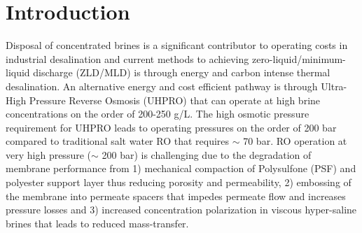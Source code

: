 \section{Introduction}
\label{sec:intro}
Disposal of concentrated brines is a significant contributor to operating costs in industrial desalination and current methods to achieving zero-liquid/minimum-liquid discharge (ZLD/MLD) is through energy and carbon intense thermal desalination. An alternative energy and cost efficient pathway is through Ultra-High Pressure Reverse Osmosis (UHPRO) that can operate at high brine concentrations on the order of 200-250 g/L. The high osmotic pressure requirement for UHPRO leads to operating pressures on the order of 200 bar compared to traditional salt water RO that requires $\sim$ 70 bar. RO operation at very high pressure ($\sim$ 200 bar) is challenging due to the degradation of membrane performance from 1) mechanical compaction of Polysulfone (PSF) and polyester support layer thus reducing porosity and permeability, 2) embossing of the membrane into permeate spacers that impedes permeate flow and increases pressure losses and 3) increased concentration polarization in viscous hyper-saline brines that leads to reduced mass-transfer. 

